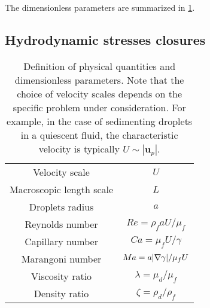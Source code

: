 The dimensionless parameters are summarized in \ref{tab:dimensionless_para}. 


\subsection{Hydrodynamic stresses closures}


\begin{table}
    \centering
\begin{tabular}{|c|c|}\hline
    Velocity scale & $U$ \\
    Macroscopic length scale & $L$ \\
    Droplets radius & $a$ \\
    Reynolds number & $Re = \rho_f a U / \mu_f$   \\
    Capillary number & $Ca = \mu_f U / \gamma$ \\
    Marangoni number & $Ma =  a|\mathbf{\nabla}\gamma| / \mu_f U$ \\\hline
Viscosity ratio & $\lambda = \mu_d / \mu_f$ \\
Density ratio & $\zeta = \rho_d / \rho_f$ \\
\hline
    \end{tabular}
    \caption{Definition of physical quantities and dimensionless parameters.
    Note that the choice of velocity scales depends on the specific problem under consideration. 
    For example, in the case of sedimenting droplets in a quiescent fluid, the characteristic velocity is typically $U \sim |\textbf{u}_p|$.}
    \label{tab:dimensionless_para}
\end{table}



